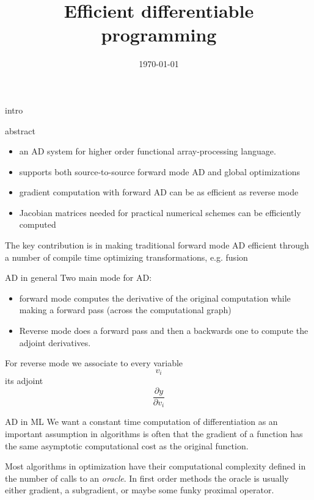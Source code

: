 \documentclass[smaller]{beamer}
\date{\today}
\title{Efficient differentiable programming}
\begin{document}
\maketitle

\begin{frame}{intro}
\begin{block}{abstract}
\begin{itemize}
\item an AD system for higher order functional array-processing language.
\item supports both source-to-source forward mode AD and global optimizations
\item gradient computation with forward AD can be as efficient as reverse mode
\item Jacobian matrices needed for practical numerical schemes can be efficiently computed
\end{itemize}
The key contribution is in making traditional forward mode AD efficient
through a number of compile time optimizing transformations, e.g. fusion
\end{block}
\end{frame}

\begin{frame}{AD in general}
Two main mode for AD:
\begin{itemize}
\item forward mode computes the derivative of the original computation while making a forward pass (across the computational graph)
\item Reverse mode does a forward pass and then a backwards one to compute the adjoint derivatives.
\end{itemize}
For reverse mode  we associate to every variable $$ v_i $$ its adjoint $$ \frac{\partial y}{\partial v_i} $$
\end{frame}

\begin{frame}[label={sec:org075497c}]{AD in ML}
We want a constant time computation of differentiation as an important
assumption in algorithms is often that the gradient of a function has the
same asymptotic computational cost as the original function.

Most algorithms in optimization have their computational complexity defined in
the number of calls to an \emph{oracle}. In \alert{first order methods} the oracle
is usually either gradient, a subgradient, or maybe some funky proximal
operator.
\end{frame}
\end{document}

